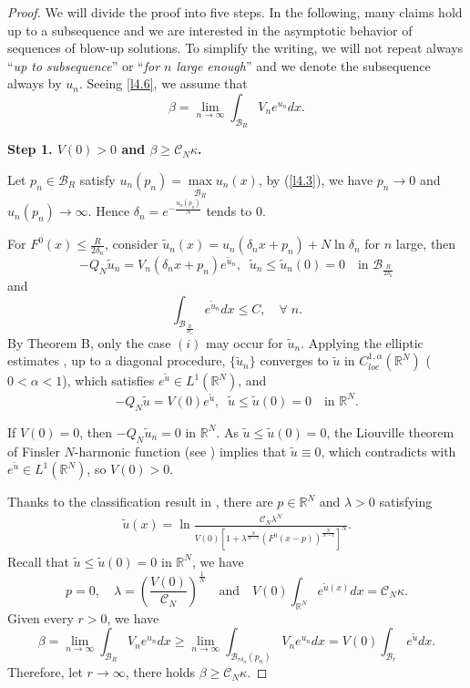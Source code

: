 \documentclass[11pt]{amsart}
\numberwithin{equation}{section}
\newcommand{\R}{\mathbb{R}}
\begin{document}
\begin{proof}
We will divide the proof into five steps. In the following, many claims hold up to a subsequence and we are interested in the asymptotic behavior of sequences of blow-up solutions. To simplify the writing, we will not repeat always ``{\it up to subsequence}'' or ``{\it for $n$ large enough}'' and we denote the subsequence always by $u_n$. Seeing \eqref{l4.6}, we assume that
$$\beta=\lim_{n\rightarrow\infty}\int_{\mathcal{B}_{R}}V_{n}e^{u_{n}}dx.$$

\textbf{Step 1. $V(0)>0$ and $\beta\geq\mathcal{C}_{N}\kappa$.}

Let $p_n\in \mathcal{B}_{R}$ satisfy $u_{n}(p_n)=\max\limits_{\overline{\mathcal{B}}_{R}}u_{n}(x)$, by (\ref{l4.3}), we have $p_n\rightarrow0$ and $u_{n}(p_n)\rightarrow\infty$. Hence $\delta_{n}=e^{-\frac{u_{n}(p_n)}{N}}$ tends to $0$.

For $F^{0}(x)\leq \frac{R}{2\delta_n}$, consider $\widetilde{u}_{n}(x)=u_{n}(\delta_{n}x+p_n)+N\ln\delta_{n}$ for $n$ large, then
$$
-Q_{N}\widetilde{u}_{n} = V_{n}(\delta_{n}x+p_n)e^{\widetilde{u}_{n}}, \; \;
\widetilde{u}_{n}\leq \widetilde{u}_{n}(0) = 0 \quad \mbox{in }  \mathcal{B}_{\frac{R}{2\delta_n}}$$
and
$$\int_{\mathcal{B}_{\frac{R}{2\delta_n}}}e^{\widetilde{u}_{n}}dx\leq C, \quad \forall \; n.$$
By Theorem B, only the case $(i)$ may occur for $\widetilde u_n$. Applying the elliptic estimates \cite{D1983}, up to a diagonal procedure,  $\{\widetilde{u}_{n}\}$ converges to $\widetilde{u}$ in $C^{1, \alpha}_{loc}(\mathbb{R}^{N})$ ($0<\alpha<1$), which satisfies $e^{\widetilde{u}} \in L^1(\R^N)$, and
$$ -Q_{N}\widetilde{u} =V(0)e^{\widetilde{u}},  \;\;  \widetilde{u} \leq \widetilde{u}(0) = 0  \quad \mbox{in }\mathbb{R}^{N}.$$

If $V(0)=0$, then $-Q_{N}\widetilde{u}_{n} = 0$ in $\mathbb{R}^{N}$. As $\widetilde{u}\leq \widetilde{u}(0) = 0$, the Liouville theorem of Finsler $N$-harmonic function (see \cite{HKM1993}) implies that $\widetilde{u} \equiv 0$, which contradicts with $e^{\widetilde{u}} \in L^1(\R^N)$, so $V(0)>0$.

Thanks to the classification result in \cite{CL2023}, there are $p \in \R^N$ and $\lambda > 0$ satisfying
\begin{align}\label{class}
\widetilde{u}(x)=\ln\frac{\mathcal{C}_{N}\lambda^{N}}{V(0)\left[1+\lambda^{\frac{N}{N-1}}\left(F^{0}(x-p)\right)^{\frac{N}{N-1}}\right]^{N}}.
\end{align}
Recall that $\widetilde{u} \leq \widetilde{u}(0)=0$ in $\mathbb{R}^{N}$, we have
$$p =0,\quad \lambda=\left(\frac{V(0)}{\mathcal{C}_{N}}\right)^{\frac{1}{N}} \quad\mbox{and}\quad V(0)\int_{\mathbb{R}^{N}}e^{\widetilde{u}(x)}dx=\mathcal{C}_{N}\kappa.$$
Given every $r>0$, we have
$$\beta=\lim\limits_{n\rightarrow\infty}\int_{\mathcal{B}_{R}}V_{n}e^{u_{n}}dx\geq\lim\limits_{n\rightarrow\infty}\int_{\mathcal{B}_{r\delta_{n}}(p_n)}V_{n}e^{u_{n}}dx=V(0)\int_{\mathcal{B}_{r}}e^{\widetilde{u}}dx.$$
Therefore, let $r\rightarrow\infty$, there holds $\beta\geq \mathcal{C}_{N}\kappa$.


\end{proof}
\end{document}

